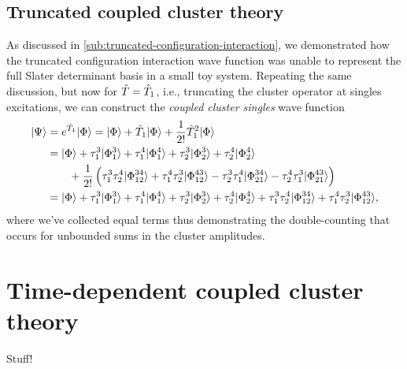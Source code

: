         \subsection{Truncated coupled cluster theory}
            As discussed in \autoref{sub:truncated-configuration-interaction},
            we demonstrated how the truncated configuration interaction wave
            function was unable to represent the full Slater determinant basis
            in a small toy system.
            Repeating the same discussion, but now for $\hat{T} = \hat{T}_1$,
            i.e., truncating the cluster operator at singles excitations, we can
            construct the \emph{coupled cluster singles} wave function
            \begin{align}
                | \Psi \rangle &= e^{\hat{T}_1}| \Phi \rangle
                = | \Phi \rangle + \hat{T}_1| \Phi \rangle + \frac{1}{2!}\hat{T}_1^2| \Phi \rangle
                \\
                &= | \Phi \rangle
                + \tau^{3}_{1}| \Phi^{3}_{1} \rangle
                + \tau^{4}_{1}| \Phi^{4}_{1} \rangle
                + \tau^{3}_{2}| \Phi^{3}_{2} \rangle
                + \tau^{4}_{2}| \Phi^{4}_{2} \rangle
                \nonumber \\
                &\qquad
                + \frac{1}{2!}\left( 
                    \tau^{3}_{1}\tau^{4}_{2}| \Phi^{34}_{12} \rangle
                    + \tau^{4}_{1}\tau^{3}_{2}| \Phi^{43}_{12} \rangle
                    - \tau^{3}_{2}\tau^{4}_{1}| \Phi^{34}_{21} \rangle
                    - \tau^{4}_{2}\tau^{3}_{1}| \Phi^{43}_{21} \rangle
                 \right)
                \\
                &= | \Phi \rangle
                + \tau^{3}_{1}| \Phi^{3}_{1} \rangle
                + \tau^{4}_{1}| \Phi^{4}_{1} \rangle
                + \tau^{3}_{2}| \Phi^{3}_{2} \rangle
                + \tau^{4}_{2}| \Phi^{4}_{2} \rangle
                + \tau^{3}_{1}\tau^{4}_{2}| \Phi^{34}_{12} \rangle
                + \tau^{4}_{1}\tau^{3}_{2}| \Phi^{43}_{12} \rangle,
            \end{align}
            where we've collected equal terms thus demonstrating the
            double-counting that occurs for unbounded sums in the cluster
            amplitudes.

    \section{Time-dependent coupled cluster theory}
        Stuff!

